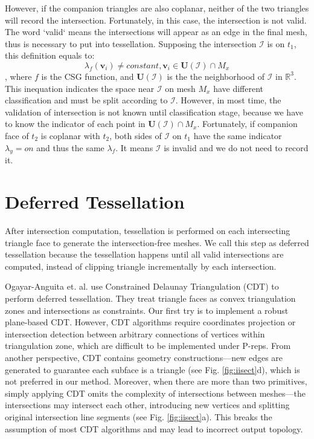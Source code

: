 \documentclass[10pt,journal,compsoc]{IEEEtran}
\begin{document}
However, if the companion triangles are also coplanar, neither of the two triangles will record the intersection. Fortunately, in this case, the intersection is not valid. The word `valid` means the intersections will appear as an edge in the final mesh, thus is necessary to put into tessellation. Supposing the intersection $\mathcal{I}$  is on $t_1$, this definition equals to:
\begin{equation}
\lambda_f(\bm{v}_i) \neq constant, \bm{v}_i \in \bm{U}(\mathcal{I}) \cap M_x
\end{equation}
, where $f$ is the CSG function, and $\bm{U}(\mathcal{I})$ is the the neighborhood of $\mathcal{I}$ in $\mathbb{R}^3$. This inequation indicates the space near $\mathcal{I}$ on mesh $M_x$ have different classification and must be split according to $\mathcal{I}$. However, in most time, the validation of intersection is not known until classification stage, because we have to know the indicator of each point in $ \bm{U}(\mathcal{I}) \cap M_x$. Fortunately, if companion face of $t_2$ is coplanar with $t_2$, both sides of $\mathcal{I}$ on $t_1$ have the same indicator $\lambda_y=on$ and thus the same $\lambda_f$. It means $\mathcal{I}$ is invalid and we do not need to record it.

\section{Deferred Tessellation}



\label{sec:tessellation}
After intersection computation, tessellation is performed on each intersecting triangle face to generate the intersection-free meshes. We call this step as deferred tessellation because the tessellation happens until all valid intersections are computed, instead of clipping triangle incrementally by each intersection.

Ogayar-Anguita et. al. \cite{ogayar2015deferred} use Constrained Delaunay Triangulation (CDT) to perform deferred tessellation. They treat triangle faces as convex triangulation zones and intersections as constraints. Our first try is to implement a robust plane-based CDT. However, CDT algorithms \cite{chew1989constrained,preparata2012computational} require coordinates projection or intersection detection between arbitrary connections of vertices within triangulation zone, which are difficult to be implemented under P-reps. From another perspective, CDT contains geometry constructions---new edges are generated to guarantee each subface is a triangle (see Fig. \ref{fig:iisect}d), which is not preferred in our method. Moreover, when there are more than two primitives, simply applying CDT omits the complexity of intersections between meshes---the intersections may intersect each other, introducing new vertices and splitting original intersection line segments (see Fig. \ref{fig:iisect}a). This breaks the assumption of most CDT algorithms and may lead to incorrect output topology.
\end{document}

